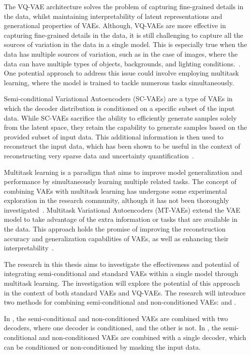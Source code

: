 The VQ-VAE architecture solves the problem of capturing fine-grained details in the data, whilst maintaining interpretability of latent representations and generational properties of VAEs. 
Although, VQ-VAEs are more effective in capturing fine-grained details in the data, it is still challenging to capture all the sources of variation in the data in a single model. This is especially true when the data has multiple sources of variation, such as in the case of images, where the data can have multiple types of objects, backgrounds, and lighting conditions.~\cite{Kingma_2019,vqvae, vqvae2}. One potential approach to address this issue could involve employing multitask learning, where the model is trained to tackle numerous tasks simultaneously.

Semi-conditional Variational Autoencoders (SC-VAEs) are a type of VAEs in which the decoder distribution is conditioned on a specific subset of the input data. While SC-VAEs sacrifice the ability to efficiently generate samples solely from the latent space, they retain the capability to generate samples based on the provided subset of input data. This additional information is then used to reconstruct the input data, which has been shown to be useful in the context of reconstructing very sparse data and uncertainty quantification~\cite{Gundersen_2021}.

Multitask learning is a paradigm that aims to improve model generalization and performance by simultaneously learning multiple related tasks. The concept of combining VAEs with multitask learning has undergone some experimental exploration in the research community, although it has not been thoroughly investigated~\cite{multitaskvib}. Multitask Variational Autoencoders (MT-VAEs) extend the VAE model to take advantage of the extra information or tasks that are available in the data. This approach holds the promise of improving the reconstruction accuracy and generalization capabilities of VAEs, as well as enhancing their interpretability~\cite{multitasklearning}.

The research in this thesis aims to investigate the effectiveness and potential of integrating semi-conditional and standard VAEs within a single model through multitask learning. The investigation will explore the potential of this approach in the context of both standard VAEs and VQ-VAEs. The research will introduce two methods for combining semi-conditional and non-conditioned VAEs: and .

In , the semi-conditional and non-conditioned VAEs are combined with two decoders, where one decoder is conditioned, and the other is not. In , the semi-conditional and non-conditioned VAEs are combined with a single decoder, which can be conditioned or non-conditioned by masking the input data.

